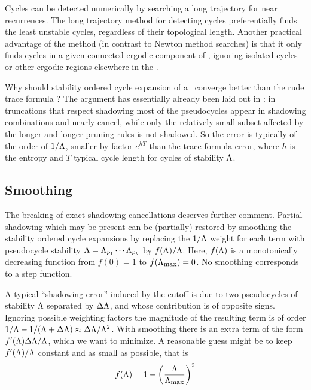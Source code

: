 Cycles can be detected numerically by
searching a long trajectory for near recurrences.
The long trajectory method for detecting cycles
preferentially finds
the least unstable cycles, regardless of their topological length.
Another practical advantage of the method (in contrast to
Newton method searches)
is that it only finds
cycles in a given connected ergodic component of {\statesp},
ignoring  isolated cycles or other ergodic regions
elsewhere in the {\statesp}.

Why should stability ordered cycle expansion of a \dzeta\ converge
better than the rude trace formula
?
The argument has essentially already been laid out in
:
in truncations that respect shadowing most of
the pseudocycles appear in shadowing combinations and nearly cancel,
while only the relatively small subset affected by the longer and
longer pruning rules is not shadowed. So the error is typically
of the order of $1/\Lambda$, smaller by factor $e^{hT}$ than the
trace formula
error, where $h$ is the entropy and
$T$ typical cycle length for cycles of stability  $\Lambda$.

\subsection{Smoothing}
\label{s-Smoothing}

The breaking of exact shadowing cancellations deserves further comment.
Partial shadowing which may be present can be (partially) restored by smoothing
the stability ordered cycle expansions by replacing the
$1/\Lambda$ weight for each term with
pseudocycle stability
$\Lambda=
\Lambda_{p_1}\cdots\Lambda_{p_k}$ by $f(\Lambda)/\Lambda$.
Here, $f(\Lambda)$ is a monotonically decreasing function from $f(0)=1$ to
$f(\stabCutoff)=0$.  No smoothing corresponds to a step function.

A typical ``shadowing error'' induced by the cutoff is due to two
pseudocycles of stability $\Lambda$ separated by $\Delta\Lambda$, and
whose contribution is of opposite signs.
Ignoring possible weighting factors the magnitude of the resulting term
is of order
$1/\Lambda-1/(\Lambda+\Delta\Lambda)
\approx\Delta\Lambda/\Lambda^2$.
With smoothing there is an
extra term of the form $f'(\Lambda)\Delta\Lambda/\Lambda$, which we
want to minimize.  A reasonable guess might be to keep $f'(\Lambda)/\Lambda$
constant and as small as possible, that is
\[
f(\ExpaEig)=1-\left(\frac{\ExpaEig}{\stabCutoff}\right)^2
\]

